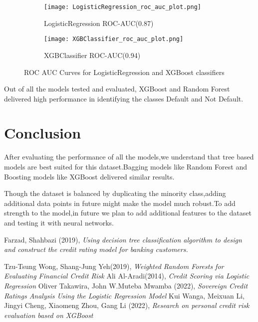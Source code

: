 \documentclass[12pt]{article}
\begin{document}
\begin{figure}[!htb]
     \centering
     \begin{subfigure}[b]{0.3\textwidth}
         \centering
         \texttt{[image: LogisticRegression\_roc\_auc\_plot.png]}
         \caption{LogisticRegression ROC-AUC(0.87)}
         \label{fig:DT}
     \end{subfigure}
     \hfill
     \begin{subfigure}[b]{0.3\textwidth}
         \centering
         \texttt{[image: XGBClassifier\_roc\_auc\_plot.png]}
         \caption{XGBClassifier ROC-AUC(0.94)}
         \label{fig:XGB}
     \end{subfigure}
        \caption{ROC AUC Curves for LogisticRegression and XGBoost classifiers}
        \label{fig:ROC AUC}
\end{figure}

Out of all the models tested and evaluated, XGBoost and Random Forest delivered high performance in identifying the classes Default and Not Default.



\pagebreak
\section{Conclusion}
After evaluating the performance of all the models,we understand that tree based models are best suited for this dataset.Bagging models like Random Forest and Boosting models like XGBoost delivered similar results.

Though the dataset is balanced by duplicating the minority class,adding additional data points in future might make the model much robust.To add strength to the model,in future we plan to add additional features to the dataset and testing it with neural networks.

\begin{thebibliography}{}


\bibitem{}
Farzad, Shahbazi (2019), \emph{ Using decision tree classification algorithm to design and construct the credit rating model for banking customers.}

Tzu-Tsung Wong, Shang-Jung Yeh(2019), \emph{Weighted Random Forests for Evaluating Financial Credit Risk}
Ali Al-Aradi(2014), \emph{Credit Scoring via Logistic Regression}
Oliver Takawira, John W.Muteba Mwamba (2022), \emph{Sovereign Credit Ratings Analysis Using the Logistic Regression Model}
Kui Wanga, Meixuan Li, Jingyi Cheng, Xiaomeng Zhou, Gang Li (2022), \emph{Research on personal credit risk evaluation based on XGBoost}

\end{thebibliography}
\end{document}
